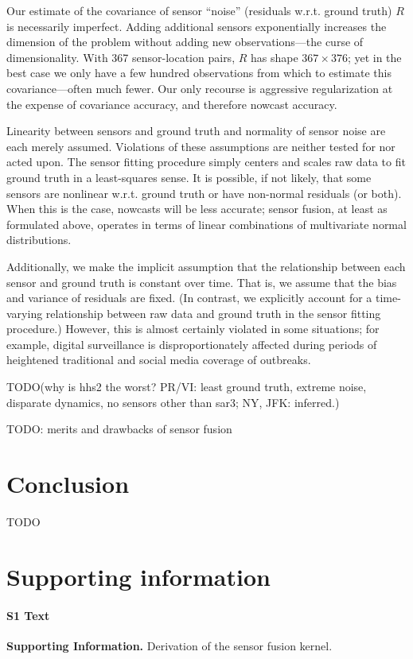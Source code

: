 \documentclass[10pt,letterpaper]{article}
\begin{document}
Our estimate of the covariance of sensor ``noise'' (residuals w.r.t. ground
truth) $R$ is necessarily imperfect. Adding additional sensors exponentially
increases the dimension of the problem without adding new observations---the
curse of dimensionality. With 367 sensor-location pairs, $R$ has shape $367
\times 376$; yet in the best case we only have a few hundred observations from
which to estimate this covariance---often much fewer. Our only recourse is
aggressive regularization at the expense of covariance accuracy, and therefore
nowcast accuracy.

Linearity between sensors and ground truth and normality of sensor noise are
each merely assumed. Violations of these assumptions are neither tested for nor
acted upon. The sensor fitting procedure simply centers and scales raw data to
fit ground truth in a least-squares sense. It is possible, if not likely, that
some sensors are nonlinear w.r.t. ground truth or have non-normal residuals (or
both). When this is the case, nowcasts will be less accurate; sensor fusion, at
least as formulated above, operates in terms of linear combinations of
multivariate normal distributions.

Additionally, we make the implicit assumption that the relationship between
each sensor and ground truth is constant over time. That is, we assume that the
bias and variance of residuals are fixed. (In contrast, we explicitly account
for a time-varying relationship between raw data and ground truth in the sensor
fitting procedure.) However, this is almost certainly violated in some
situations; for example, digital surveillance is disproportionately affected
during periods of heightened traditional and social media coverage of
outbreaks.

TODO(why is hhs2 the worst? PR/VI: least ground truth, extreme noise, disparate
dynamics, no sensors other than sar3; NY, JFK: inferred.)

TODO: merits and drawbacks of sensor fusion

\section*{Conclusion}

TODO

\section*{Supporting information}

\paragraph*{S1 Text}
\label{S1_Text}
{\bf Supporting Information.} Derivation of the sensor fusion kernel.
\end{document}
